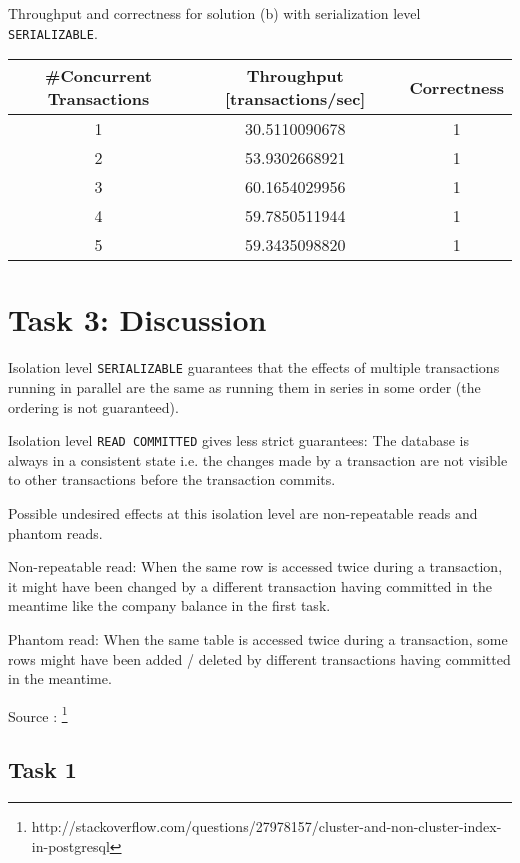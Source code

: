 \documentclass[11pt]{scrartcl}
\begin{document}
Throughput and correctness for solution (b) with serialization level
{\tt\small SERIALIZABLE}.

\bigskip

\begin{tabular}{c|c|c}
  \#Concurrent Transactions & Throughput [transactions/sec] & Correctness
  \\\hline
  1 & 30.5110090678 & 1\\
  2 & 53.9302668921 & 1\\
  3 & 60.1654029956 & 1\\
  4 & 59.7850511944 & 1\\
  5 & 59.3435098820 & 1\\    
\end{tabular}

\medskip

\section*{Task 3: Discussion}

Isolation level {\tt\small SERIALIZABLE} guarantees that the effects
of multiple transactions running in parallel are the same as running them
in series in some order (the ordering is not guaranteed).

Isolation level {\tt\small READ COMMITTED} gives less strict guarantees:
The database is always in a consistent state i.e. the changes made by a transaction
are not visible to other transactions before the transaction commits.

Possible undesired effects at this isolation level are non-repeatable reads
and phantom reads.

Non-repeatable read: When the same row is accessed twice during a transaction, it
might have been changed by a different transaction having committed in the meantime
like the company balance in the first task.

Phantom read: When the same table is accessed twice during a transaction,
some rows might have been added / deleted by different transactions
having committed in the meantime.

Source :
\footnote{\label{postgresDoc}http://stackoverflow.com/questions/27978157/cluster-and-non-cluster-index-in-postgresql}

\subsection*{Task 1}
\end{document}
